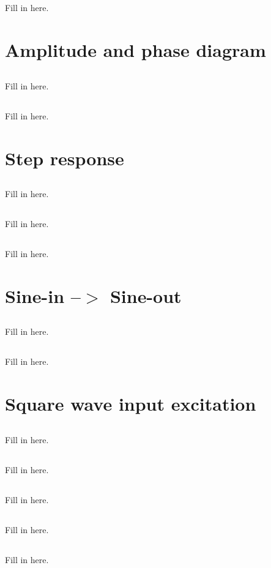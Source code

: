 \documentclass[11pt]{article}
\begin{document}
\subsection{}
Fill in here.

\section{Amplitude and phase diagram}
\subsection{}
Fill in here.
\subsection{}
Fill in here.
\section{Step response}
\subsection{}
Fill in here.
\subsection{}
Fill in here.
\subsection{}
Fill in here.
\section{Sine-in --$>$ Sine-out}
\subsection{}
Fill in here.
\subsection{}
Fill in here.
\section{Square wave input excitation}
\subsection{}
Fill in here.
\subsection{}
Fill in here.
\subsection{}
Fill in here.
\subsection{}
Fill in here.
\subsection{}
Fill in here.
\end{document}
